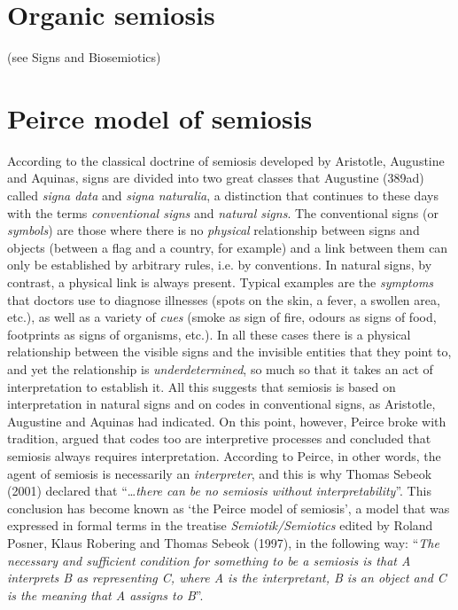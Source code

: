 \documentclass[12pt]{article}
\begin{document}
\section{Organic semiosis} (see Signs and Biosemiotics)


\section{Peirce model of semiosis}
According to the classical doctrine of semiosis developed by Aristotle, Augustine and Aquinas, signs are divided into two great classes that Augustine (389ad) called \textit{signa data} and \textit{signa naturalia}, a distinction that continues to these days with the terms \textit{conventional signs} and \textit{natural signs}. The conventional signs (or \textit{symbols}) are those where there is no \textit{physical} relationship between signs and objects (between a flag and a country, for example) and a link between them can only be established by arbitrary rules, i.e. by conventions. In natural signs, by contrast, a physical link is always present. Typical examples are the \textit{symptoms} that doctors use to diagnose illnesses (spots on the skin, a fever, a swollen area, etc.), as well as a variety of \textit{cues} (smoke as sign of fire, odours as signs of food, footprints as signs of organisms, etc.). In all these cases there is a physical relationship between the visible signs and the invisible entities that they point to, and yet the relationship is \textit{underdetermined}, so much so that it takes an act of interpretation to establish it. All this suggests that semiosis is based on interpretation in natural signs and on codes in conventional signs, as Aristotle, Augustine and Aquinas had indicated. On this point, however, Peirce broke with tradition, argued that codes too are interpretive processes and concluded that semiosis always requires interpretation. According to Peirce, in other words, the agent of semiosis is necessarily an \textit{interpreter}, and this is why Thomas Sebeok (2001) declared that ``\ldots \textit{there can be no semiosis without interpretability}''. This conclusion has become known as `the Peirce model of semiosis', a model that was expressed in formal terms in the treatise \textit{Semiotik/Semiotics} edited by Roland Posner, Klaus Robering and Thomas Sebeok (1997), in the following way: ``\textit{The necessary and sufficient condition for something to be a semiosis is that A interprets B as representing C, where A is the interpretant, B is an object and C is the meaning that A assigns to B}''.
\end{document}
